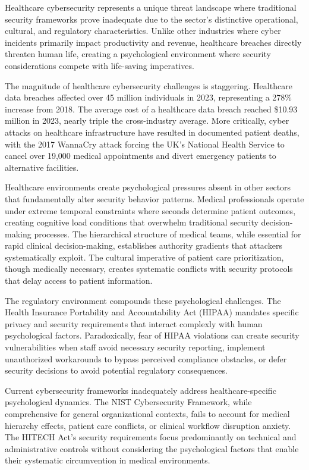 \documentclass[10pt, twocolumn]{article}
\begin{document}
Healthcare cybersecurity represents a unique threat landscape where traditional security frameworks prove inadequate due to the sector's distinctive operational, cultural, and regulatory characteristics. Unlike other industries where cyber incidents primarily impact productivity and revenue, healthcare breaches directly threaten human life, creating a psychological environment where security considerations compete with life-saving imperatives.

The magnitude of healthcare cybersecurity challenges is staggering. Healthcare data breaches affected over 45 million individuals in 2023, representing a 278\% increase from 2018\cite{hhs2024}. The average cost of a healthcare data breach reached \$10.93 million in 2023, nearly triple the cross-industry average\cite{ibm2024}. More critically, cyber attacks on healthcare infrastructure have resulted in documented patient deaths, with the 2017 WannaCry attack forcing the UK's National Health Service to cancel over 19,000 medical appointments and divert emergency patients to alternative facilities\cite{wannacry2018}.

Healthcare environments create psychological pressures absent in other sectors that fundamentally alter security behavior patterns. Medical professionals operate under extreme temporal constraints where seconds determine patient outcomes, creating cognitive load conditions that overwhelm traditional security decision-making processes. The hierarchical structure of medical teams, while essential for rapid clinical decision-making, establishes authority gradients that attackers systematically exploit. The cultural imperative of patient care prioritization, though medically necessary, creates systematic conflicts with security protocols that delay access to patient information.

The regulatory environment compounds these psychological challenges. The Health Insurance Portability and Accountability Act (HIPAA) mandates specific privacy and security requirements that interact complexly with human psychological factors. Paradoxically, fear of HIPAA violations can create security vulnerabilities when staff avoid necessary security reporting, implement unauthorized workarounds to bypass perceived compliance obstacles, or defer security decisions to avoid potential regulatory consequences.

Current cybersecurity frameworks inadequately address healthcare-specific psychological dynamics. The NIST Cybersecurity Framework, while comprehensive for general organizational contexts, fails to account for medical hierarchy effects, patient care conflicts, or clinical workflow disruption anxiety. The HITECH Act's security requirements focus predominantly on technical and administrative controls without considering the psychological factors that enable their systematic circumvention in medical environments.
\end{document}

